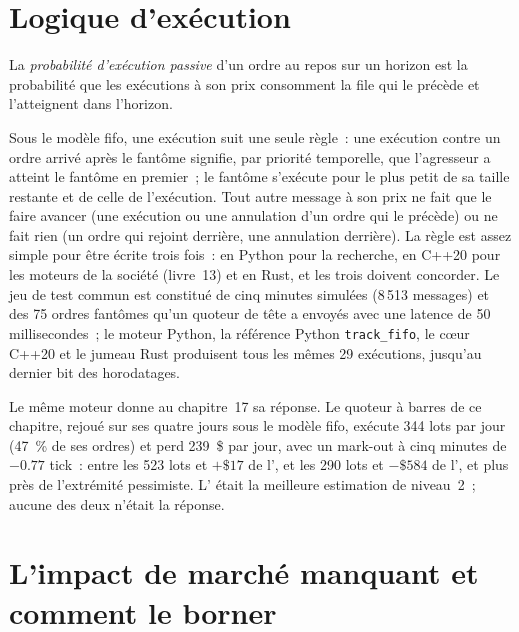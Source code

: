 \section{Logique d'exécution}

\begin{definition}\label{def:rs:order-book-replay-simulation:passive}
La \emph{probabilité d'exécution passive} d'un ordre au repos sur un horizon est la probabilité que les exécutions à son prix
consomment la file qui le précède et l'atteignent dans l'horizon.
\end{definition}

Sous le modèle fifo, une exécution suit une seule règle~: une exécution contre un ordre arrivé après le fantôme signifie, par priorité temporelle, que l'agresseur a
atteint le fantôme en premier~; le fantôme s'exécute pour le plus petit de sa taille restante et de celle de l'exécution. Tout autre message à son prix ne fait que
le faire avancer (une exécution ou une annulation d'un ordre qui le précède) ou ne fait rien (un ordre qui rejoint derrière, une annulation derrière). La règle est
assez simple pour être écrite trois fois~: en Python pour la recherche, en C++20 pour les moteurs de la société (livre~13) et en Rust, et les trois doivent concorder. Le jeu
de test commun est constitué de cinq minutes simulées (8\,513 messages) et des 75 ordres fantômes qu'un quoteur de tête a envoyés avec une latence de 50 millisecondes~; le moteur Python,
la référence Python \texttt{track\_fifo}, le cœur C++20 et le jumeau Rust produisent tous les mêmes 29 exécutions, jusqu'au dernier bit des horodatages.

Le même moteur donne au chapitre~17 sa réponse. Le quoteur à barres de ce chapitre, rejoué sur ses quatre jours sous le modèle fifo, exécute 344 lots par jour (47~\%
de ses ordres) et perd 239~\$ par jour, avec un mark-out à cinq minutes de $-0.77$ tick~: entre les 523 lots et $+\$17$ de l', et les
290 lots et $-\$584$ de l', et plus près de l'extrémité pessimiste. L' était la meilleure estimation de niveau~2~; aucune des deux n'était la réponse.

\section{L'impact de marché manquant et comment le borner}

